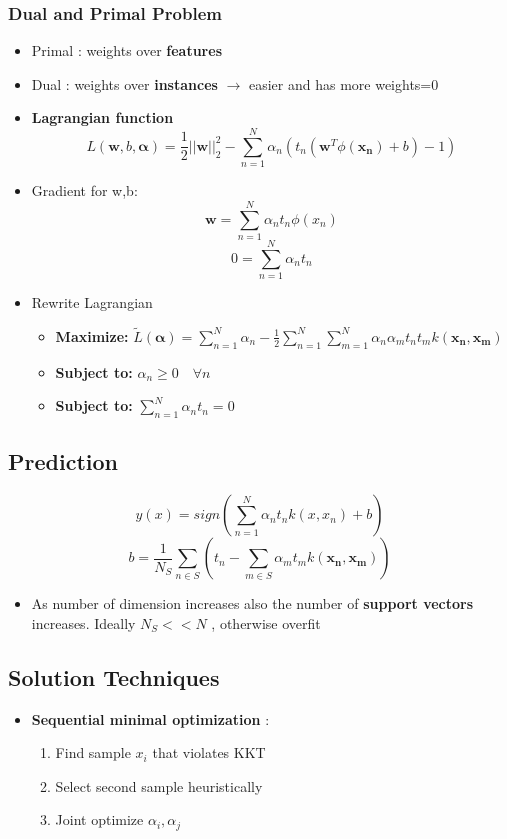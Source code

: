 \documentclass[12pt]{article} %
\begin{document}
\subsubsection{Dual and Primal Problem}
\begin{itemize}
\item Primal : weights over \textbf{features}
\item Dual : weights over \textbf{instances} $\rightarrow $ easier and has more weights=0

\item \textbf{Lagrangian function}
$$ L(\bm{w},b,\bm{\alpha})= \frac{1}{2}||\bm{w}||_2^2 - \sum \limits_{n=1}^N \alpha_n(t_n(\bm{w}^T\phi(\bm{x_n})+b)-1)$$

\item Gradient for w,b:
$$ \bm{w}= \sum \limits_{n=1}^N \alpha_nt_n\phi(x_n)$$
$$ 0 = \sum \limits_{n=1}^N \alpha_nt_n$$

\item Rewrite Lagrangian
\begin{itemize}
\item \textbf{Maximize: } $\tilde{L}(\bm{\alpha})= \sum \limits_{n=1}^N \alpha_n - \frac{1}{2}\sum \limits_{n=1}^N \sum \limits_{m=1}^N \alpha_n\alpha_mt_nt_mk(\bm{x_n,x_m})$
\item \textbf{Subject to:} $\alpha_n \geq 0 \quad \forall n$
\item \textbf{Subject to:} $\sum \limits_{n=1}^N \alpha_nt_n=0$
\end{itemize}
\end{itemize}

\subsection{Prediction}
$$ y(x) = sign\left(  \sum \limits_{n=1}^N \alpha_nt_nk(x,x_n)+b \right)$$
$$ b= \frac{1}{N_S}\sum \limits_{n \in S} \left( t_n -\sum \limits_{m \in S} \alpha_m t_m k(\bm{x_n,x_m}) \right)$$
\begin{itemize}
\item As number of dimension increases also the number of \textbf{support vectors} increases. Ideally $N_S << N$ , otherwise overfit
\end{itemize}

\subsection{Solution Techniques}
\begin{itemize}
\item \textbf{Sequential minimal optimization} :
\begin{enumerate}
\item Find sample $x_i$ that violates KKT
\item Select second sample heuristically
\item Joint optimize $\alpha_i,\alpha_j$
\end{enumerate}
\end{itemize}
\end{document}
